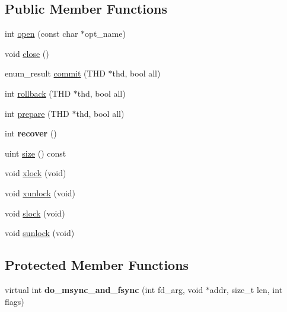 \subsection*{Public Member Functions}
\begin{DoxyCompactItemize}
\item 
int \mbox{\hyperlink{classTC__LOG__MMAP_a2a7bf09548c80ed522a20ad9b9cff295}{open}} (const char $\ast$opt\+\_\+name)
\item 
void \mbox{\hyperlink{classTC__LOG__MMAP_aefc50f2b1eeb68743a1ab72219f85db4}{close}} ()
\item 
enum\+\_\+result \mbox{\hyperlink{classTC__LOG__MMAP_ac8696930a9546b39057462eca51b3648}{commit}} (T\+HD $\ast$thd, bool all)
\item 
int \mbox{\hyperlink{classTC__LOG__MMAP_a5a050951b50e08417abbec375ab30614}{rollback}} (T\+HD $\ast$thd, bool all)
\item 
int \mbox{\hyperlink{classTC__LOG__MMAP_a334d9853acc2f7b12ae2a3014806f6c4}{prepare}} (T\+HD $\ast$thd, bool all)
\item 
\mbox{\label{classTC__LOG__MMAP_acb6584c06c2ebd6b721cba31bd36967b}} 
int {\bfseries recover} ()
\item 
uint \mbox{\hyperlink{classTC__LOG__MMAP_a242ceec9296d75dcfc09a9109ffa6a80}{size}} () const
\item 
void \mbox{\hyperlink{classTC__LOG__MMAP_ab6e8fad0d9b8167b22d22f4372739202}{xlock}} (void)
\item 
void \mbox{\hyperlink{classTC__LOG__MMAP_a728d9b1b03c73850ba116b93677a42a8}{xunlock}} (void)
\item 
void \mbox{\hyperlink{classTC__LOG__MMAP_a8c90387699139f5e9d244e60c5a126a1}{slock}} (void)
\item 
void \mbox{\hyperlink{classTC__LOG__MMAP_a8f2d68fb0873cc813dcfc65d4d922261}{sunlock}} (void)
\end{DoxyCompactItemize}
\subsection*{Protected Member Functions}
\begin{DoxyCompactItemize}
\item 
\mbox{\label{classTC__LOG__MMAP_a73e8c82f6fbafc767ed9dacc31729d94}} 
virtual int {\bfseries do\+\_\+msync\+\_\+and\+\_\+fsync} (int fd\+\_\+arg, void $\ast$addr, size\+\_\+t len, int flags)
\end{DoxyCompactItemize}
